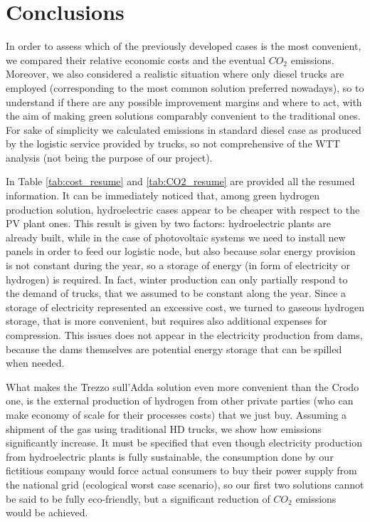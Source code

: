 \newpage
\chapter{Conclusions}
In order to assess which of the previously developed cases is the most convenient, we compared their relative economic costs and the eventual $CO_2$ emissions. Moreover, we also considered a realistic situation where only diesel trucks are employed (corresponding to the most common solution preferred nowadays), so to understand if there are any possible improvement margins and where to act, with the aim of making green solutions comparably convenient to the traditional ones. For sake of simplicity we calculated emissions in standard diesel case as produced by the logistic service provided by trucks, so not comprehensive of the WTT analysis (not being the purpose of our project).





In Table \ref{tab:cost_resume} and \ref{tab:CO2_resume} are provided all the resumed information. It can be immediately noticed that, among green hydrogen production solution, hydroelectric cases appear to be cheaper with respect to the PV plant ones. This result is given by two factors: hydroelectric plants are already built, while in the case of photovoltaic systems we need to install new panels in order to feed our logistic node, but also because solar energy provision is not constant during the year, so a storage of energy (in form of electricity or hydrogen) is required. In fact, winter production can only partially respond to the demand of trucks, that we assumed to be constant along the year. Since a storage of electricity represented an excessive cost, we turned to gaseous hydrogen storage, that is more convenient, but requires also additional expenses for compression. This issues does not appear in the electricity production from dams, because the dams themselves are potential energy storage that can be spilled when needed.

What makes the Trezzo sull'Adda solution even more convenient than the Crodo one, is the external production of hydrogen from other private parties (who can make economy of scale for their processes costs) that we just buy. Assuming a shipment of the gas using traditional HD trucks, we show how emissions significantly increase. It must be specified that even though electricity production from hydroelectric plants is fully sustainable, the consumption done by our fictitious company would force actual consumers to buy their power supply from the national grid (ecological worst case scenario), so our first two solutions cannot be said to be fully eco-friendly, but a significant reduction of $CO_2$ emissions would be achieved.

